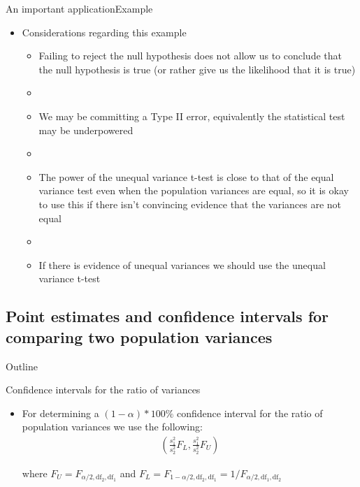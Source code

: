 \documentclass[xcolor=dvipsnames]{beamer}
\begin{document}
\begin{frame}{An important application}{Example}
	\begin{itemize}
		\item Considerations regarding this example
		\begin{itemize}
			\item Failing to reject the null hypothesis does not allow us to conclude that the null hypothesis is true (or rather give us the likelihood that it is true)
			\item[]
			\item We may be committing a Type II error, equivalently the statistical test may be underpowered
			\item[]
			\item The power of the unequal variance t-test is close to that of the equal variance test even when the population variances are equal, so it is okay to use this if there isn't convincing evidence that the variances are not equal
			\item[]
			\item If there is evidence of unequal variances we should use the unequal variance t-test
		\end{itemize}
	\end{itemize}
\end{frame}

\subsection{Point estimates and confidence intervals for comparing two population variances}
\begin{frame}{Outline}
	\tableofcontents[currentsection,subsectionstyle=show/shaded/hide]
\end{frame}

\begin{frame}{Confidence intervals for the ratio of variances}
	\begin{itemize}
		\item For determining a $(1-\alpha)*100 \%$ confidence interval for the ratio of population variances we use the following: 
		\begin{gather*}
			\left(\frac{s_1^2}{s_2^2} F_L, \frac{s_1^2}{s_2^2} F_U \right)
		\end{gather*}
					
		where $F_U = F_{\alpha / 2, \text{df}_2, \text{df}_1}$ and $F_L = F_{1-\alpha / 2, \text{df}_2, \text{df}_1} = 1 / F_{\alpha / 2, \text{df}_1, \text{df}_2}$
	\end{itemize}
\end{frame}
\end{document}
